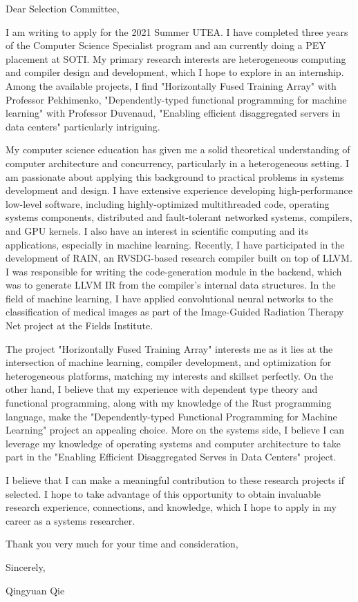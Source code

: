 \documentclass[11pt]{article}
\begin{document}
\setlength{\parindent}{0em}
\setlength{\parskip}{1em}
\noindent
Dear Selection Committee,

\vspace{5mm}

I am writing to apply for the 2021 Summer UTEA. I have completed three years of the Computer Science Specialist program and am currently doing a PEY placement at SOTI. My primary research interests are heterogeneous computing and compiler design and development, which I hope to explore in an internship. Among the available projects, I find "Horizontally Fused Training Array" with Professor Pekhimenko, "Dependently-typed functional programming for machine learning" with Professor Duvenaud, "Enabling efficient disaggregated servers in data centers" particularly intriguing.

My computer science education has given me a solid theoretical understanding of computer architecture and concurrency, particularly in a heterogeneous setting. I am passionate about applying this background to practical problems in systems development and design. I have extensive experience developing high-performance low-level software, including highly-optimized multithreaded code, operating systems components, distributed and fault-tolerant networked systems, compilers, and GPU kernels. I also have an interest in scientific computing and its applications, especially in machine learning. Recently, I have participated in the development of RAIN, an RVSDG-based research compiler built on top of LLVM. I was responsible for writing the code-generation module in the backend, which was to generate LLVM IR from the compiler's internal data structures. In the field of machine learning, I have applied convolutional neural networks to the classification of medical images as part of the Image-Guided Radiation Therapy Net project at the Fields Institute.

The project "Horizontally Fused Training Array" interests me as it lies at the intersection of machine learning, compiler development, and optimization for heterogeneous platforms, matching my interests and skillset perfectly. On the other hand, I believe that my experience with dependent type theory and functional programming, along with my knowledge of the Rust programming language, make the "Dependently-typed Functional Programming for Machine Learning" project an appealing choice. More on the systems side, I believe I can leverage my knowledge of operating systems and computer architecture to take part in the "Enabling Efficient Disaggregated Serves in Data Centers" project.

I believe that I can make a meaningful contribution to these research projects if selected. I hope to take advantage of this opportunity to obtain invaluable research experience, connections, and knowledge, which I hope to apply in my career as a systems researcher.

\vspace{5mm}
\noindent
Thank you very much for your time and consideration,

\vspace{5mm}
\noindent
Sincerely,

\noindent
Qingyuan Qie
\end{document}
